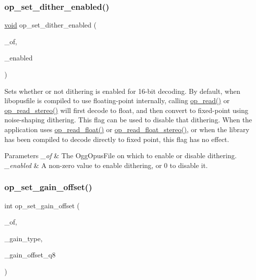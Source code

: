 \subsubsection{\texorpdfstring{op\+\_\+set\+\_\+dither\+\_\+enabled()}{op\_set\_dither\_enabled()}}
{\footnotesize\ttfamily \hyperlink{png_8h_ac9c84fa68bbad002983e35ce3663c686}{void} op\+\_\+set\+\_\+dither\+\_\+enabled (\begin{DoxyParamCaption}\item[{Ogg\+Opus\+File $\ast$}]{\+\_\+of,  }\item[{int}]{\+\_\+enabled }\end{DoxyParamCaption})}

Sets whether or not dithering is enabled for 16-\/bit decoding. By default, when {\ttfamily libopusfile} is compiled to use floating-\/point internally, calling \hyperlink{group__stream__decoding_ga963c917749335e29bb2b698c1cb20a10}{op\+\_\+read()} or \hyperlink{group__stream__decoding_gaaca17ad3fd6430dc8fd43308149428eb}{op\+\_\+read\+\_\+stereo()} will first decode to float, and then convert to fixed-\/point using noise-\/shaping dithering. This flag can be used to disable that dithering. When the application uses \hyperlink{group__stream__decoding_ga73493002d84a234f5e19b70f1dddbe2a}{op\+\_\+read\+\_\+float()} or \hyperlink{group__stream__decoding_ga9736f96563500c0978f56f0fd6bdad83}{op\+\_\+read\+\_\+float\+\_\+stereo()}, or when the library has been compiled to decode directly to fixed point, this flag has no effect. 
\begin{DoxyParams}{Parameters}
{\em \+\_\+of} & The {\ttfamily Ogg\+Opus\+File} on which to enable or disable dithering. \\
\hline
{\em \+\_\+enabled} & A non-\/zero value to enable dithering, or 0 to disable it. \\
\hline
\end{DoxyParams}
\mbox{\label{group__stream__decoding_ga7df927613ccf57996319678e08513289}} 
\subsubsection{\texorpdfstring{op\+\_\+set\+\_\+gain\+\_\+offset()}{op\_set\_gain\_offset()}}
{\footnotesize\ttfamily int op\+\_\+set\+\_\+gain\+\_\+offset (\begin{DoxyParamCaption}\item[{Ogg\+Opus\+File $\ast$}]{\+\_\+of,  }\item[{int}]{\+\_\+gain\+\_\+type,  }\item[{\hyperlink{opus__types_8h_aa4d309d6f80b99dbabebc8f98879ab9a}{opus\+\_\+int32}}]{\+\_\+gain\+\_\+offset\+\_\+q8 }\end{DoxyParamCaption})}

